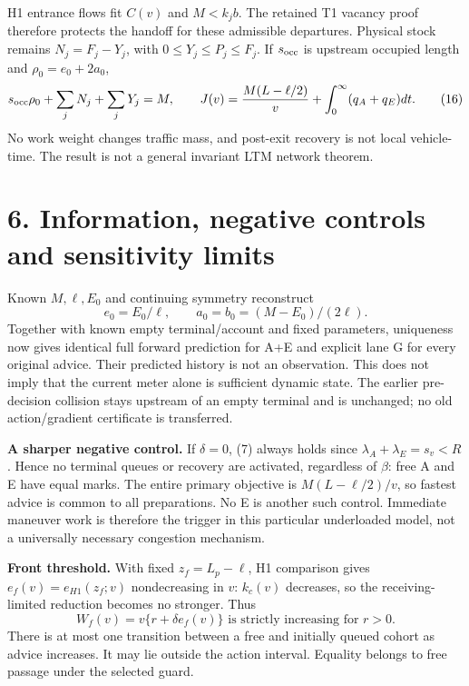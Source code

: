 \documentclass[11pt,a4paper]{article}
\begin{document}
H1 entrance flows fit $C(v)$ and $M<k_jb$. The retained T1 vacancy proof
therefore protects the handoff for these admissible departures. Physical
stock remains $N_j=F_j-Y_j$, with $0\leq Y_j\leq P_j\leq F_j$.
If $s_{\rm occ}$ is upstream occupied length and $\rho_0=e_0+2a_0$,
\begin{equation}
 s_{\rm occ}\rho_0+\sum_jN_j+\sum_jY_j=M,\qquad
 J(v)=\frac{M(L-\ell/2)}v+\int_0^\infty(q_A+q_E)dt.\tag{16}
\end{equation}
No work weight changes traffic mass, and post-exit recovery is not local
vehicle-time. The result is not a general invariant LTM network theorem.

\newpage
\section*{6. Information, negative controls and sensitivity limits}
Known $M,\ell,E_0$ and continuing symmetry reconstruct
\begin{equation}
 e_0=E_0/\ell,\qquad a_0=b_0=(M-E_0)/(2\ell).\tag{17}
\end{equation}
Together with known empty terminal/account and fixed parameters, uniqueness
now gives identical full forward prediction for A+E and explicit lane G
for every original advice. Their predicted history is not an observation.
This does not imply that the current meter alone is sufficient dynamic
state. The earlier pre-decision collision stays upstream of an empty
terminal and is unchanged; no old action/gradient certificate is transferred.

\textbf{A sharper negative control.} If $\delta=0$, (7) always holds
since $\lambda_A+\lambda_E=s_v<R$. Hence no terminal queues or recovery
are activated, regardless of $\beta$: free A and E have equal marks.
The entire primary objective is $M(L-\ell/2)/v$, so fastest advice is
common to all preparations. No E is another such control. Immediate
maneuver work is therefore the trigger in this particular underloaded
model, not a universally necessary congestion mechanism.

\textbf{Front threshold.} With fixed $z_f=L_p-\ell$, H1 comparison gives
$e_f(v)=e_{H1}(z_f;v)$ nondecreasing in $v$: $k_c(v)$ decreases, so
the receiving-limited reduction becomes no stronger. Thus
\begin{equation}
 W_f(v)=v\{r+\delta e_f(v)\}
 \text{ is strictly increasing for }r>0.\tag{18}
\end{equation}
There is at most one transition between a free and initially queued cohort
as advice increases. It may lie outside the action interval. Equality
belongs to free passage under the selected guard.
\end{document}
